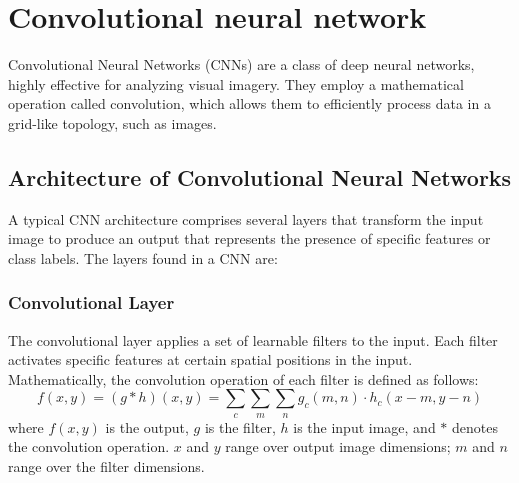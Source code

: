




























\section{Convolutional neural network}
Convolutional Neural Networks (CNNs) \cite{convolutional_neural_network} are a class of deep neural networks, highly effective for analyzing visual imagery. They employ a mathematical operation called convolution, which allows them to efficiently process data in a grid-like topology, such as images.

\subsection{Architecture of Convolutional Neural Networks}
A typical CNN architecture comprises several layers that transform the input image to produce an output that represents the presence of specific features or class labels. The layers found in a CNN are:

\subsubsection{Convolutional Layer}
The convolutional layer applies a set of learnable filters to the input. Each filter activates specific features at certain spatial positions in the input. Mathematically, the convolution operation of each filter is defined as follows:
\[f(x, y) = (g * h)(x, y) = \sum_c\sum_m\sum_n g_c(m,n) \cdot h_c(x-m, y-n)\]
where \(f(x, y)\) is the output, \(g\) is the filter, \(h\) is the input image, and \(*\) denotes the convolution operation. \(x\) and \(y\) range over output image dimensions; \(m\) and \(n\) range over the filter dimensions.


